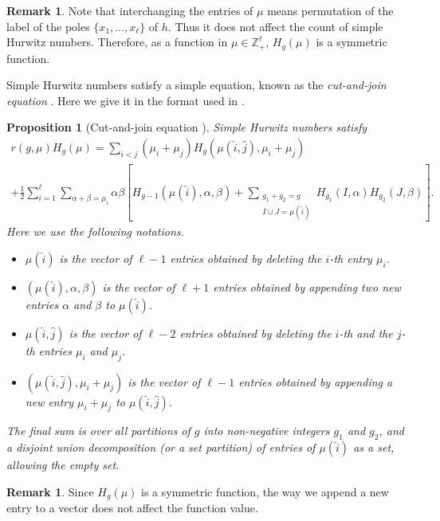 \documentclass{amsart}
\newtheorem{prop}[thm]{Proposition}
\theoremstyle{definition}
\newtheorem{rem}[thm]{Remark}
\numberwithin{equation}{section}
\numberwithin{figure}{section}
\newcommand{\bZ}{{\mathbb{Z}}}
\newcommand{\half}{{\frac{1}{2}}}
\begin{document}
\begin{rem}
Note that interchanging the entries of $\mu$ 
 means permutation of the label of
the poles $\{x_1,\dots,x_\ell\}$ of $h$.
Thus it does not affect the count of simple
Hurwitz numbers. 
Therefore, as a function in $\mu\in\bZ_+ ^\ell$,
$H_g(\mu)$ is a symmetric function.
\end{rem}

Simple Hurwitz numbers satisfy a 
simple equation, known as the \emph{cut-and-join
equation} \cite{GJ, V}. Here we give it in the
format used in \cite{MZ}.

\begin{prop}[Cut-and-join equation \cite{MZ}]
Simple Hurwitz numbers satisfy
\begin{multline}
\label{eq:caj}
r(g,\mu) H_g(\mu)
=
\sum_{i<j} (\mu_i+\mu_j)H_g(\mu(\hat{i},\hat{j})
,\mu_i+\mu_j)
\\
+
\half \sum_{i=1} ^\ell \sum_{\alpha+\beta=\mu_i}
\alpha\beta
\left[
H_{g-1}(\mu(\hat{i}),\alpha,\beta)
+
\sum_{\substack{g_1+g_2=g
\\
I\sqcup J=\mu(\hat{i})}}
H_{g_1}(I,\alpha) H_{g_2}(J,\beta)
\right].
\end{multline}
Here we use the following notations.
\begin{itemize}
\item
$\mu(\hat{i})$ is the vector of $\ell -1$
entries obtained by deleting the $i$-th entry
$\mu_i$.
\item
$(\mu(\hat{i}),\alpha,\beta)$ is the 
 vector of $\ell +1$
entries obtained by appending two new
entries $\alpha$ and $\beta$ to $\mu(\hat{i})$.
\item
$\mu(\hat{i},\hat{j})$ is the vector of $\ell -2$
entries obtained by deleting the $i$-th and the $j$-th 
entries
$\mu_i$ and $\mu_j$.
\item
$(\mu(\hat{i},\hat{j})
,\mu_i+\mu_j)$ is the 
 vector of $\ell -1$
entries obtained by appending a new
entry $\mu_i+\mu_j$ to $\mu(\hat{i},\hat{j})$.
\end{itemize}
The final sum is over all partitions of $g$
into non-negative integers $g_1$ and $g_2$,
and a disjoint union decomposition (or a set partition) of 
entries of $\mu(\hat{i})$ as a set, allowing 
the empty set.
\end{prop}

\begin{rem}
Since $H_g(\mu)$ is a symmetric function,
the way we append a new entry to a vector does not
affect the function value.
\end{rem}
\end{document}
